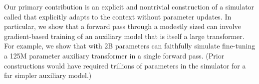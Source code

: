 
Our primary contribution is an explicit and nontrivial construction of a simulator called \simulator{} that explicitly adapts to the context without parameter updates.
In particular, we show that a forward pass through a modestly sized \simulator{} can involve gradient-based training of an auxiliary model that is itself a  large transformer.
For example, we show that \simulator{} with 2B parameters can faithfully simulate fine-tuning a 125M parameter auxiliary transformer in a single forward pass.
(Prior constructions would have required trillions of parameters in the simulator for a far simpler auxiliary model.) %

